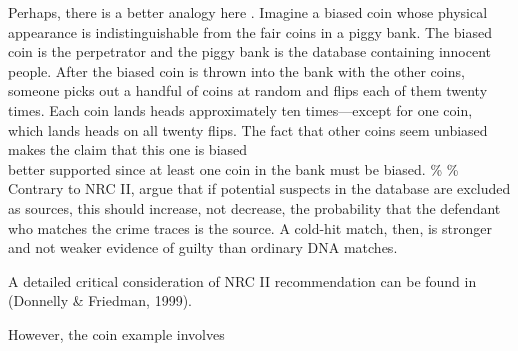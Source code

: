 \documentclass[10pt,dvipsnames,enabledeprecatedfontcommands]{scrartcl}
\begin{document}
Perhaps, there is a better analogy here
\citep[p.\ 950]{donnelly1999DNADatabaseSearches}. Imagine a biased coin
whose physical appearance is indistinguishable from the fair coins in a
piggy bank. The biased coin is the perpetrator and the piggy bank is the
database containing innocent people. After the biased coin is thrown
into the bank with the other coins, someone picks out a handful of coins
at random and flips each of them twenty times. Each coin lands heads
approximately ten times---except for one coin, which lands heads on all
twenty flips. The fact that other coins seem unbiased makes the claim
that this one is biased\\
better supported since at least one coin in the bank must be biased. \%
\% Contrary to NRC II, \cite{donnelly1999DNADatabaseSearches} argue that
if potential suspects in the database are excluded as sources, this
should increase, not decrease, the probability that the defendant who
matches the crime traces is the source. A cold-hit match, then, is
stronger and not weaker evidence of guilty than ordinary DNA matches.

A detailed critical consideration of NRC II recommendation can be found
in (Donnelly \& Friedman, 1999).

However, the coin example involves
\end{document}
